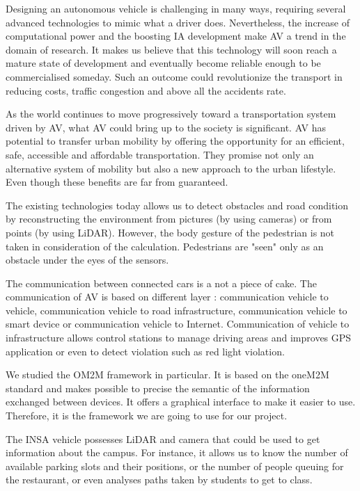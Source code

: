 
Designing an autonomous vehicle is challenging in many ways, requiring several advanced technologies to mimic what a driver does. Nevertheless, the increase of computational power and the boosting IA development make AV a trend in the domain of research. It makes us believe that this technology will soon reach a mature state of development and eventually become reliable enough to be commercialised someday. Such an outcome could revolutionize the transport in reducing costs, traffic congestion and above all the accidents rate.
\smallskip

As the world continues to move progressively toward a transportation system driven by AV, what AV could bring up to the society is significant. 
AV has potential to transfer urban mobility by offering the opportunity for an efficient, safe, accessible and affordable transportation. They promise not only an alternative system of mobility but also a new approach to the urban lifestyle. Even though these benefits are far from guaranteed.
\smallskip

The existing technologies today allows us to detect obstacles and road condition by reconstructing the environment from pictures (by using cameras) or from points (by using LiDAR). However, the body gesture of the pedestrian is not taken in consideration of the calculation. Pedestrians are "seen" only as an obstacle under the eyes of the sensors. 

\smallskip

The communication between connected cars is a not a piece of cake. The communication of AV is based on different layer : communication vehicle to vehicle, communication vehicle to road infrastructure, communication vehicle to smart device or communication vehicle to Internet. Communication of vehicle to infrastructure allows control stations to manage driving areas and improves GPS application or even to detect violation such as red light violation.
\smallskip

We studied the OM2M framework in particular. It is based on the oneM2M standard and makes possible to precise the semantic of the information exchanged between devices. It offers a graphical interface to make it easier to use. Therefore, it is the framework we are going to use for our project.\smallskip

The INSA vehicle possesses LiDAR and camera that could be used to get information about the campus. For instance, it allows us to know the number of available parking slots and their positions, or the number of people queuing for the restaurant, or even analyses paths taken by students to get to class.